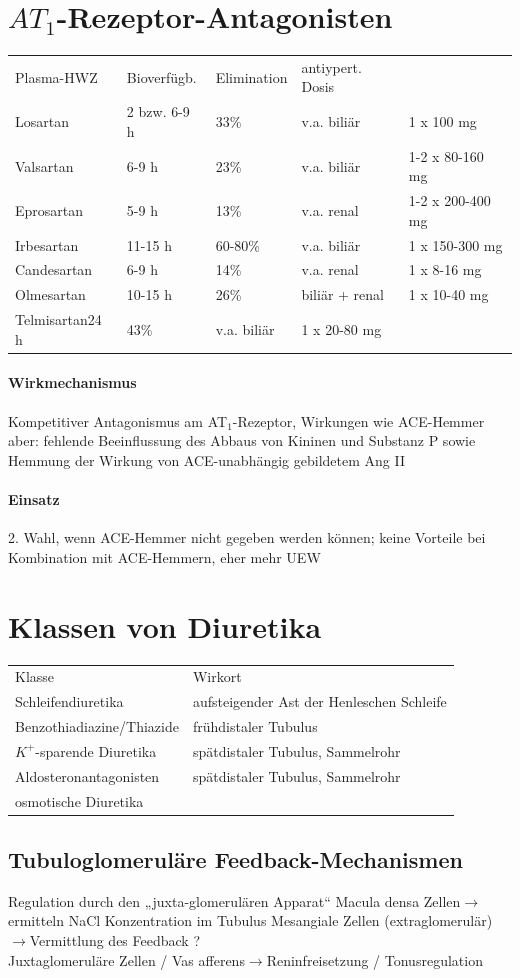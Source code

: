 \documentclass[10pt,a4paper]{report}
\begin{document}
\section{$AT_1$-Rezeptor-Antagonisten}
\begin{tabularx}{\textwidth}{XXXXX}
Plasma-HWZ&Bioverfügb.&Elimination&antiypert. Dosis\\
Losartan&2 bzw. 6-9 h&33\%&v.a. biliär&1 x 100 mg\\	
Valsartan&6-9 h&23\%&v.a. biliär&1-2 x 80-160 mg\\
Eprosartan&5-9 h&13\%&v.a. renal&1-2 x 200-400 mg\\
Irbesartan&11-15 h&60-80\%&	v.a. biliär&1 x 150-300 mg\\ 
Candesartan&6-9 h&14\%&v.a. renal&1 x 8-16 mg\\	
Olmesartan&10-15 h&26\%&biliär + renal&1 x 10-40 mg\\
Telmisartan24 h&43\%&v.a. biliär&1 x 20-80 mg\\ 
\end{tabularx}
\paragraph{Wirkmechanismus}Kompetitiver Antagonismus am AT$_1$-Rezeptor, Wirkungen wie ACE-Hemmer aber:	fehlende Beeinflussung des Abbaus von Kininen und Substanz P sowie Hemmung der Wirkung von ACE-unabhängig gebildetem Ang II
\paragraph{Einsatz} 2. Wahl, wenn ACE-Hemmer nicht gegeben werden können; keine Vorteile bei Kombination mit ACE-Hemmern, eher mehr UEW
\section{Klassen von Diuretika}
\begin{tabularx}{\textwidth}{XX}
Klasse&Wirkort\\
Schleifendiuretika&aufsteigender Ast der Henleschen Schleife\\
Benzothiadiazine/Thiazide&frühdistaler Tubulus\\
$K^+$-sparende Diuretika&spätdistaler Tubulus, Sammelrohr\\
Aldosteronantagonisten&	spätdistaler Tubulus, Sammelrohr\\
osmotische Diuretika&\\
\end{tabularx}
\subsection{Tubuloglomeruläre Feedback-Mechanismen}
Regulation durch den „juxta-glomerulären Apparat“ Macula densa Zellen$\rightarrow$ermitteln NaCl Konzentration im Tubulus Mesangiale Zellen (extraglomerulär)$\rightarrow$Vermittlung des Feedback ?
\\ 
Juxtaglomeruläre Zellen / Vas afferens$\rightarrow$Reninfreisetzung / Tonusregulation
\end{document}

